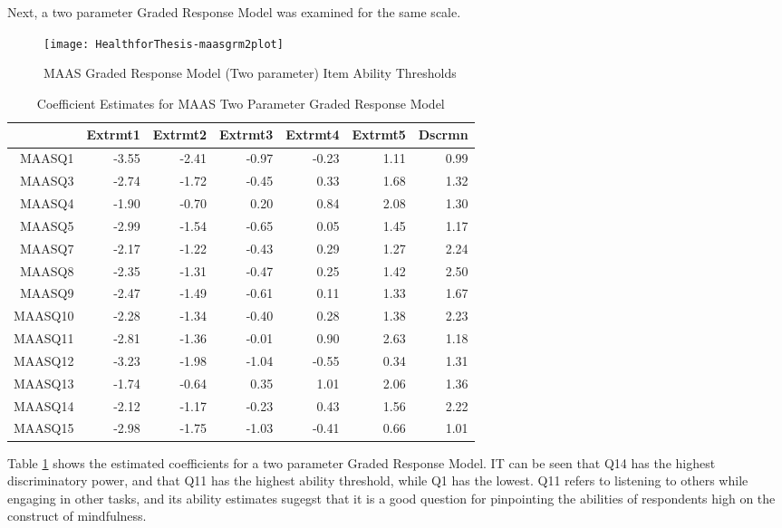 \documentclass{article}
\begin{document}
Next, a two parameter Graded Response Model was examined for the same scale. 

\begin{figure}
\texttt{[image: HealthforThesis-maasgrm2plot]}
  \caption{MAAS Graded Response Model (Two parameter) Item Ability Thresholds}
  \label{fig:maasgrm2plplot}
\end{figure}

\begin{table}[ht]
\centering
\begin{tabular}{rrrrrrr}
  \hline
 & Extrmt1 & Extrmt2 & Extrmt3 & Extrmt4 & Extrmt5 & Dscrmn \\ 
  \hline
MAASQ1 & -3.55 & -2.41 & -0.97 & -0.23 & 1.11 & 0.99 \\ 
  MAASQ3 & -2.74 & -1.72 & -0.45 & 0.33 & 1.68 & 1.32 \\ 
  MAASQ4 & -1.90 & -0.70 & 0.20 & 0.84 & 2.08 & 1.30 \\ 
  MAASQ5 & -2.99 & -1.54 & -0.65 & 0.05 & 1.45 & 1.17 \\ 
  MAASQ7 & -2.17 & -1.22 & -0.43 & 0.29 & 1.27 & 2.24 \\ 
  MAASQ8 & -2.35 & -1.31 & -0.47 & 0.25 & 1.42 & 2.50 \\ 
  MAASQ9 & -2.47 & -1.49 & -0.61 & 0.11 & 1.33 & 1.67 \\ 
  MAASQ10 & -2.28 & -1.34 & -0.40 & 0.28 & 1.38 & 2.23 \\ 
  MAASQ11 & -2.81 & -1.36 & -0.01 & 0.90 & 2.63 & 1.18 \\ 
  MAASQ12 & -3.23 & -1.98 & -1.04 & -0.55 & 0.34 & 1.31 \\ 
  MAASQ13 & -1.74 & -0.64 & 0.35 & 1.01 & 2.06 & 1.36 \\ 
  MAASQ14 & -2.12 & -1.17 & -0.23 & 0.43 & 1.56 & 2.22 \\ 
  MAASQ15 & -2.98 & -1.75 & -1.03 & -0.41 & 0.66 & 1.01 \\ 
   \hline
\end{tabular}
\caption{Coefficient Estimates for MAAS Two Parameter Graded Response Model} 
\label{tab:maasgrm2pl}
\end{table}

Table \ref{tab:maasgrm2pl} shows the estimated coefficients for a two parameter Graded Response Model. IT can be seen that Q14 has the highest discriminatory power, and that Q11 has the highest ability threshold, while Q1 has the lowest. Q11 refers to listening to others while engaging in other tasks, and its ability estimates sugegst that it is a good question for pinpointing the abilities of respondents high on the construct of mindfulness. 
\end{document}
